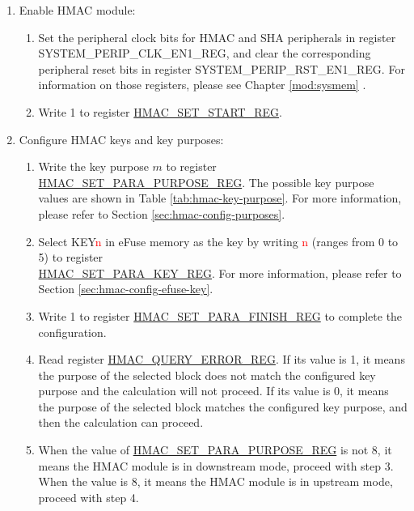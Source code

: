 \documentclass[main\_\_EN.tex]{subfiles}
\begin{document}
\begin{enumerate}
    \item Enable HMAC module:
    \begin{enumerate}
        \item Set the peripheral clock bits for HMAC and SHA peripherals in register SYSTEM\_PERIP\_CLK\_EN1\_REG, and clear the corresponding peripheral reset bits in register SYSTEM\_PERIP\_RST\_EN1\_REG. For information on those registers, please see Chapter \ref{mod:sysmem} \textit{}.
        \item Write 1 to register \hyperref[regdesc:HMACSETSTARTREG]{HMAC\_SET\_START\_REG}.
    \end{enumerate}

    \item Configure HMAC keys and key purposes:
    \begin{enumerate}
        \item Write the key purpose \begin{math}m\end{math} to register \hyperref[regdesc:HMACSETPARAPURPOSEREG]{HMAC\_SET\_PARA\_PURPOSE\_REG}. The possible key purpose values are shown in Table \ref{tab:hmac-key-purpose}. For more information, please refer to Section \ref{sec:hmac-config-purposes}.
        \item Select KEY\textcolor{red}{n} in eFuse memory as the key by writing \textcolor{red}{n} (ranges from 0 to 5) to register\\ \hyperref[regdesc:HMACSETPARAKEYREG]{HMAC\_SET\_PARA\_KEY\_REG}. For more information, please refer to Section \ref{sec:hmac-config-efuse-key}.
        \item Write 1 to register \hyperref[regdesc:HMACSETPARAFINISHREG]{HMAC\_SET\_PARA\_FINISH\_REG} to complete the configuration.
        \item Read register \hyperref[regdesc:HMACQUERYERRORREG]{HMAC\_QUERY\_ERROR\_REG}. If its value is 1, it means the purpose of the selected block does not match the configured key purpose and the calculation will not proceed. If its value is 0, it means the purpose of the selected block matches the configured key purpose, and then the calculation can proceed.
        \item When the value of \hyperref[regdesc:HMACSETPARAPURPOSEREG]{HMAC\_SET\_PARA\_PURPOSE\_REG} is not 8, it means the HMAC module is in downstream mode, proceed with step 3. When the value is 8, it means the HMAC module is in upstream mode, proceed with step 4.
    \end{enumerate}


\end{enumerate}
\end{document}

